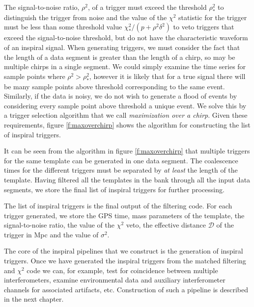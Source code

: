 The signal-to-noise ratio, $\rho^2$, of a trigger must exceed the threshold
$\rho^2_\ast$ to distinguish the trigger from noise and the value of the
$\chi^2$ statistic for the trigger must be less than some threshold value
$\chi^2_\ast/(p+\rho^2\delta^2)$ to veto triggers that exceed the
signal-to-noise threshold, but do not have the characteristic waveform of an
inspiral signal.   When generating triggers, we must consider the fact that
the length of a data segment is greater than the length of a chirp, so may be
multiple chirps in a single segment.  We could simply examine the time series
for sample points where $\rho^2 > \rho^2_\ast$, however it is likely that for
a true signal there will be many sample points above threshold corresponding
to the same event.  Similarly, if the data is noisy, we do not wish to
generate a flood of events by considering every sample point above threshold a
unique event. We solve this by a trigger selection algorithm that we call
\emph{maximization over a chirp}.  Given these requirements, figure
\ref{f:maxoverchirp} shows the algorithm for constructing the list of inspiral
triggers.

It can be seen from the algorithm in figure \ref{f:maxoverchirp}  that
multiple triggers for the same template can be generated in one data segment.
The coalescence times for the different triggers must be separated by
\textit{at least} the length of the template.  Having filtered all the
templates in the bank through all the input data segments, we store the final
list of inspiral triggers for further processing.

The list of inspiral triggers is the final output of the filtering code. For
each trigger generated, we store the GPS time, mass parameters of the
template, the signal-to-noise ratio, the value of the $\chi^2$ veto, the
effective distance $\mathcal{D}$ of the trigger in Mpc and the value of
$\sigma^2$.

The core of the inspiral pipelines that we construct is the generation of
inspiral triggers. Once we have generated the inspiral triggers from the
matched filtering and $\chi^2$ code we can, for example, test for coincidence
between multiple interferometers, examine environmental data and auxiliary
interferometer channels for associated artifacts, etc.  Construction of such a
pipeline is described in the next chapter.


